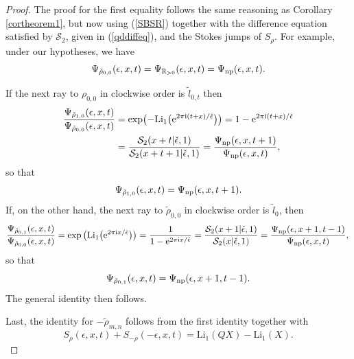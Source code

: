 \documentclass[pdftex]{sigma}
\numberwithin{equation}{section}
\begin{document}
\begin{proof}
The proof for the first equality follows the same reasoning as Corollary \ref{cortheorem1}, but now using (\ref{SBSR}) together with the difference equation satisfied by $\mathcal{S}_2$, given in (\ref{qddiffeq}), and the Stokes jumps of $S_{\rho}$. For example, under our hypotheses, we have
\begin{equation*}
 \Psi_{\tilde{\rho}_{0,0}}(\epsilon,x,t)=\Psi_{\mathbb{R}_{>0}}(\epsilon,x,t)=\Psi_{{\rm np}}(\epsilon,x,t).
\end{equation*}

If the next ray to $\rho_{0,0}$ in clockwise order is $\widetilde{l}_{0,t}$ then
\begin{align*}
 \frac{\Psi_{\tilde{\rho}_{1,0}}(\epsilon,x,t)}{\Psi_{\tilde{\rho}_{0,0}}(\epsilon,x,t)}&=\exp\bigl(-\mathrm{Li}_1\big({\rm e}^{2\pi \mathrm{i}(t+x)/\check\epsilon}\big)\bigr)=1-{\rm e}^{2\pi \mathrm{i}(t+x)/\check\epsilon} \nonumber\\
 & =\frac{\mathcal{S}_2(x+t|\check\epsilon,1)}{\mathcal{S}_2(x+t+1|\check\epsilon,1)}=\frac{\Psi_{{\rm np}}(\epsilon,x,t+1)}{\Psi_{{\rm np}}(\epsilon,x,t)},
\end{align*}
so that
\begin{equation*}
 \Psi_{\tilde{\rho}_{1,0}}(\epsilon,x,t)=\Psi_{{\rm np}}(\epsilon,x,t+1).
\end{equation*}
If, on the other hand, the next ray to $\tilde{\rho}_{0,0}$ in clockwise order is $\widetilde{l}_{0}$, then
\begin{gather*}
 \frac{\Psi_{\tilde{\rho}_{0,1}}(\epsilon,x,t)}{\Psi_{\tilde{\rho}_{0,0}}(\epsilon,x,t)} =\exp\big(\mathrm{Li}_1\big({\rm e}^{2\pi \mathrm{i} x/\check\epsilon}\big)\big)=\frac{1}{1-{\rm e}^{2\pi \mathrm{i} x/\check\epsilon}}
 =\frac{\mathcal{S}_2(x+1|\check\epsilon,1)}{\mathcal{S}_2(x|\check\epsilon,1)}=\frac{\Psi_{{\rm np}}(\epsilon,x+1,t-1)}{\Psi_{{\rm np}}(\epsilon,x,t)},\textbf{}
\end{gather*}
so that
\begin{equation*}
 \Psi_{\tilde{\rho}_{0,1}}(\epsilon,x,t)=\Psi_{{\rm np}}(\epsilon,x+1,t-1).
\end{equation*}
The general identity then follows.

Last, the identity for $-\tilde{\rho}_{m,n}$ follows from the first identity together with
\begin{equation*}
 S_{\rho}(\epsilon,x,t)+S_{-\rho}(-\epsilon,x,t)=\mathrm{Li}_1(QX)-\mathrm{Li}_1(X).\tag*{\qed}
\end{equation*}\renewcommand{\qed}{}
\end{proof}
\end{document}
